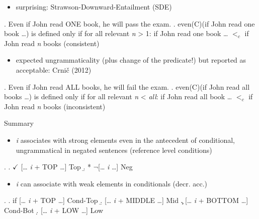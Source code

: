 \documentclass[ignorenonframetext,]{beamer}
\providecommand{\tightlist}{%
  \setlength{\itemsep}{0pt}\setlength{\parskip}{0pt}}
\begin{document}
\begin{frame}

\begin{itemize}
\tightlist
\item
  surprising: Strawson-Downward-Entailment (SDE) 
\end{itemize}

\ex. Even if John read ONE book, he will pass the exam. \a. even(C)(if
John read one book \ldots{}) is defined only if for all relevant
\emph{n} \textgreater{} 1: if John read one book \ldots{} \(<_c\) if
John read \emph{n} books \hfill (consistent)

\begin{itemize}
\tightlist
\item
  expected ungrammaticality (plus change of the predicate!) but reported
  as acceptable: Crnič (2012)
\end{itemize}

\ex. Even if John read ALL books, he will fail the exam. \a. even(C)(if
John read all books \ldots{}) is defined only if for all relevant
\emph{n} \textless{} \emph{all}: if John read all book \ldots{} \(<_c\)
if John read \emph{n} books \hfill (inconsistent)

\end{frame}



\begin{frame}{Summary}

\begin{itemize}
\tightlist
\item
  \emph{i} associates with strong elements even in the antecedent of
  conditional, ungrammatical in negated sentences (reference level conditions)
\end{itemize}

\ex. \a. \(\checkmark\) {[}\ldots{} \emph{i} + TOP \ldots{}{]}
\hfill Top \b. * \(\neg\){[}\ldots{} \emph{i} \ldots{}{]} \hfill Neg

\begin{itemize}
\tightlist
\item  \emph{i} can associate with weak elements in conditionals (decr. acc.)
\end{itemize}

\ex. \a. if {[}\ldots{} \emph{i} + TOP \ldots{}{]} \hfill Cond-Top \b.
{[}\ldots{} \emph{i} + MIDDLE \ldots{}{]} \hfill Mid \c. {[}\ldots{}
\emph{i} + BOTTOM \ldots{}{]} \hfill Cond-Bot \d. {[}\ldots{} \emph{i} +
LOW \ldots{}{]} \hfill Low

\end{frame}
\end{document}
